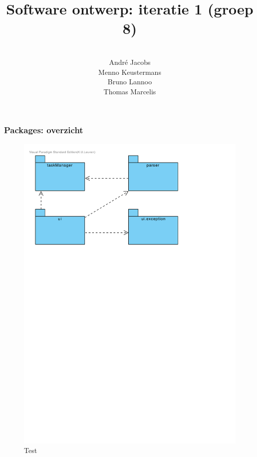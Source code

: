 \documentclass{beamer}
\title[Software ontwerp: iteratie 1]{Software ontwerp: iteratie 1 (groep 8)} %
\author[Groep 8]{\\
		Andr\'e Jacobs \\
		Menno Keustermans\\
		Bruno Lannoo \\
		Thomas Marcelis} %
\institute[KULeuven] %
{\\ %
\medskip
\textit{} %
}
\date{} %
\begin{document}
\begin{frame}
\titlepage %
\end{frame}



%		

\begin{frame}
\frametitle {Packages: overzicht}
\begin{figure}
\centering
\includegraphics[width=1.3\textwidth]{figures/PackageDiagram.pdf}
\caption{Test}
\end{figure}
\end{frame}
\end{document}
